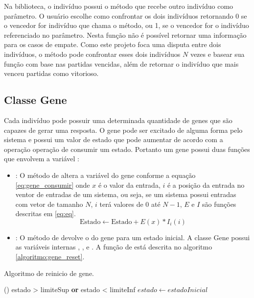 Na biblioteca, o indivíduo possui o método  que recebe outro indivíduo como parâmetro. O usuário escolhe como confrontar os dois indivíduos retornando 0 se o vencedor for indivíduo que chama o método, ou 1, se o vencedor for o indivíduo referenciado no parâmetro. Nesta função não é possível retornar uma informação para os casos de empate. Como este projeto foca uma disputa entre dois indivíduos, o método  pode confrontar esses dois indivíduos $N$ vezes e basear sua função \fitness com base nas partidas vencidas, além de retornar o indivíduo que mais venceu partidas como vitorioso.

\subsection{Classe Gene}

Cada indivíduo pode possuir uma determinada quantidade de genes que são capazes de gerar uma resposta. O gene pode ser excitado de alguma forma pelo sistema e possui um valor de estado que pode aumentar de acordo com a operação operação de consumir um estado. Portanto um gene possui duas funções que envolvem a variável :

\begin{itemize}
    \item {}: O método de  altera a variável  do gene conforme a equação \ref{eq:gene_consumir} onde $x$ é o valor da entrada, $i$ é a posição da entrada no ventor de entradas de um sistema, ou seja, se um sistema possui entradas com vetor de tamanho $N$, $i$ terá valores de 0 até $N-1$, $E$ e $I$ são funções descritas em \ref{eq:eq}.
    \begin{equation}
        \label{eq:gene_consumir}
        \mathrm{Estado} \leftarrow \mathrm{Estado} +  E(x) * I_i(i)
    \end{equation}
    \item {}: O método de  devolve o  do gene para um estado inicial. A classe Gene possui as variáveis internas , ,  e . A função de  está descrita no algoritmo \ref{algoritmo:gene_reset}.
\end{itemize}

\begin{algoritmo}
\caption{Algoritmo de reinicio de gene.}
\label{algoritmo:gene_reset}
    \If()
    {estado > limiteSup {\normalfont \textbf{or}} estado < limiteInf} {
        $estado \gets estadoInicial$
    }
\end{algoritmo}

